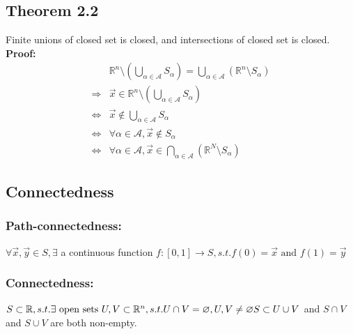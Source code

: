 \documentclass[11pt, a4paper]{article}
\begin{document}
    \subsection{Theorem 2.2}
    Finite unions of closed set is closed, and intersections of closed set is closed. \\
        \textbf{Proof:} 
        $$\begin{aligned}
            &\mathbb{R}^n \setminus (\bigcup\limits_{\alpha \in \mathscr{A}} S_\alpha) = \bigcup\limits_{\alpha \in \mathscr{A}} (\mathbb{R}^n \setminus S_\alpha) \\
            \Rightarrow& \vec{x} \in \mathbb{R}^n \setminus (\bigcup\limits_{\alpha \in \mathscr{A}} S_\alpha) \\
            \Leftrightarrow& \vec{x} \notin \bigcup\limits_{\alpha \in \mathscr{A}} S_\alpha \\
            \Leftrightarrow& \forall \alpha \in \mathscr{A}, \vec{x} \notin S_\alpha \\
            \Leftrightarrow& \forall \alpha \in \mathscr{A}, \vec{x} \in \bigcap\limits_{\alpha \in \mathscr{A}} (\mathbb{R}^N \setminus S_\alpha)
        \end{aligned}$$
    \subsection{Connectedness}
        \subsubsection{Path-connectedness:}
            $\forall \vec{x}, \vec{y} \in S, \exists$ a continuous function $f: [0, 1] \to S, s.t. f(0) = \vec{x} \text{ and } f(1) = \vec{y}$
        \subsubsection{Connectedness:}
        $S \subset \mathbb{R}, s.t. \exists \text{ open sets } U, V \subset \mathbb{R}^n, s.t. U \cap V = \varnothing, U, V \neq \varnothing \\
        S \subset U \cup V$ and $S \cap V$ and $S \cup V$ are both non-empty.         
\end{document}
